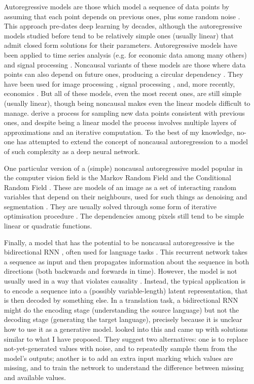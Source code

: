 \documentclass[11pt, a4paper]{book}
\begin{document}
Autoregressive models are those which model a sequence of data points by assuming that each point depends on previous ones, plus some random noise \citep{autoregressive1}. This approach pre-dates deep learning by decades, although the autoregressive models studied before tend to be relatively simple ones (usually linear) that admit closed form solutions for their parameters. Autoregressive models have been applied to time series analysis (e.g. for economic data among many others) and signal processing \citep{timeseries}. Noncausal variants of these models are those where data points can also depend on future ones, producing a circular dependency \citep{noncausallikelihood}. They have been used for image processing \citep{noncausalimage1,noncausalimage2}, signal processing \citep{noncausalsignal}, and, more recently, economics \citep{noncausaleco1,noncausaleco2}. But all of these models, even the most recent ones, are still simple (usually linear), though being noncausal makes even the linear models difficult to manage. \citet{noncausaleco2} derive a process for sampling new data points consistent with previous ones, and despite being a linear model the process involves multiple layers of approximations and an iterative computation. To the best of my knowledge, no-one has attempted to extend the concept of noncausal autoregression to a model of such complexity as a deep neural network.

One particular version of a (simple) noncausal autoregressive model popular in the computer vision field is the Markov Random Field \citep{mrf1,mrf2} and the Conditional Random Field \citep{crf1,crf2}. These are models of an image as a set of interacting random variables that depend on their neighbours, used for such things as denoising and segmentation \citep{mrfuse1,mrfuse2}. They are usually solved through some form of iterative optimisation procedure \citep{mrflearning1,mrflearning2}. The dependencies among pixels still tend to be simple linear or quadratic functions.

Finally, a model that has the potential to be noncausal autoregressive is the bidirectional RNN \citep{brnn1,brnn2}, often used for language tasks \citep{brnnuse1,brnnuse2,brnnuse3}. This recurrent network takes a sequence as input and then propagates information about the sequence in both directions (both backwards and forwards in time). However, the model is not usually used in a way that violates causality \citep{brnndenoise}. Instead, the typical application is to encode a sequence into a (possibly variable-length) latent representation, that is then decoded by something else. In a translation task, a bidirectional RNN might do the encoding stage (understanding the source language) but not the decoding stage (generating the target language), precisely because it is unclear how to use it as a generative model. \citet{brnndenoise} looked into this and came up with solutions similar to what I have proposed. They suggest two alternatives: one is to replace not-yet-generated values with noise, and to repeatedly sample them from the model's outputs; another is to add an extra input marking which values are missing, and to train the network to understand the difference between missing and available values.
\end{document}
